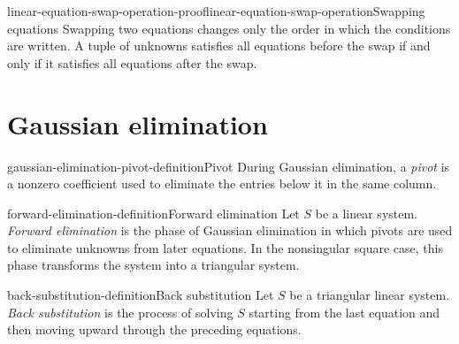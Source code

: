 \documentclass[preview]{standalone}
\begin{document}
\begin{snippetproof}{linear-equation-swap-operation-proof}{linear-equation-swap-operation}{Swapping equations}
    Swapping two equations changes only the order in which the conditions are
    written. A tuple of unknowns satisfies all equations before the swap if and
    only if it satisfies all equations after the swap.
\end{snippetproof}

\section{Gaussian elimination}

\begin{snippetdefinition}{gaussian-elimination-pivot-definition}{Pivot}
    During Gaussian elimination, a \emph{pivot} is a nonzero coefficient used
    to eliminate the entries below it in the same column.
\end{snippetdefinition}

\begin{snippetdefinition}{forward-elimination-definition}{Forward elimination}
    Let \(S\) be a linear system. \emph{Forward elimination} is the phase of
    Gaussian elimination in which pivots are used to eliminate unknowns from
    later equations. In the nonsingular square case, this phase transforms the
    system into a triangular system.
\end{snippetdefinition}

\begin{snippetdefinition}{back-substitution-definition}{Back substitution}
    Let \(S\) be a triangular linear system. \emph{Back substitution} is the
    process of solving \(S\) starting from the last equation and then moving
    upward through the preceding equations.
\end{snippetdefinition}
\end{document}
